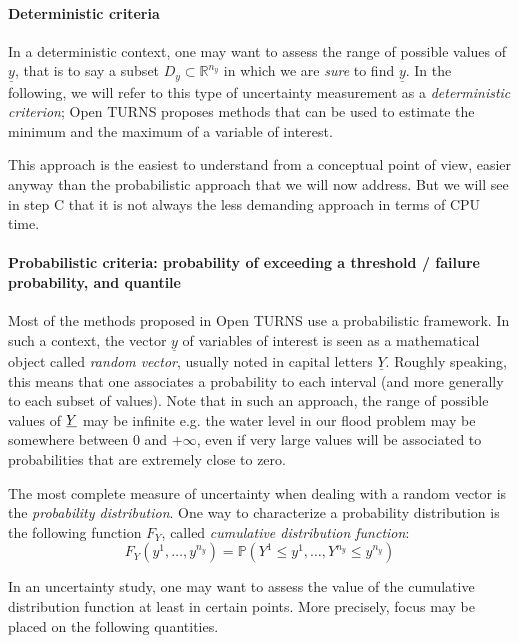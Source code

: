 \paragraph{Deterministic criteria}
\par

In a deterministic context, one may want to assess the range of possible values of $\underline{y}$, that is to say a subset $D_y \subset \mathbb{R}^{n_y}$ in which we are {\em sure} to find $\underline{y}$. In the following, we will refer to this type of uncertainty measurement as a {\em deterministic criterion}; Open TURNS proposes methods that can be used to estimate the minimum and the maximum of a variable of interest.

This approach is the easiest to understand from a conceptual point of view, easier anyway than the probabilistic approach that we will now address. But we will see in step C that it is not always the less demanding approach in terms of CPU time.

\paragraph{Probabilistic criteria: probability of exceeding a threshold / failure probability, and quantile}
\par

Most of the methods proposed in Open TURNS use a probabilistic framework. In such a context, the vector $\underline{y}$ of variables of interest is seen as a mathematical object called {\em random vector}, usually noted in capital letters $\underline{Y}$. Roughly speaking, this means that one associates a probability to each interval (and more generally to each subset of values). Note that in such an approach, the range of possible values of ${\underline{Y}}$ may be infinite e.g. the water level in our flood problem may be somewhere between 0 and $+\infty$, even if very large values will be associated to probabilities that are extremely close to zero.

The most complete measure of uncertainty when dealing with a random vector is the {\em probability distribution}. One way to characterize a probability distribution is the following function $F_Y$, called {\em cumulative distribution function}:
$$
F_Y \left( y^1,\ldots,y^{n_y} \right) = \mathbb{P} \left(  Y^1 \leq y^1,\ldots, Y^{n_y} \leq y^{n_y} \right)
$$

In an uncertainty study, one may want to assess the value of the cumulative distribution function at least in certain points. More precisely, focus may be placed on the following quantities.

